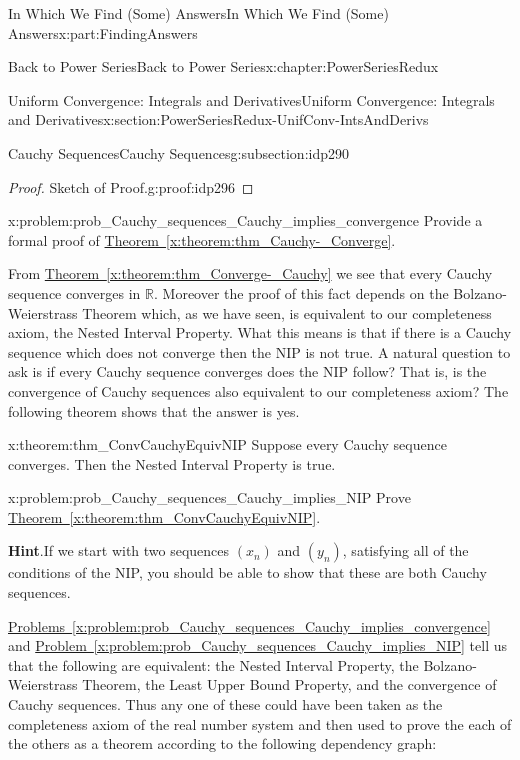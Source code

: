 \documentclass[oneside,10pt,]{book}
\newcommand{\blocktitlefont}{\relax}
\newcommand{\xreffont}{\relax}
\numberwithin{equation}{section}
\newcommand{\RR}{\mathbb {R}}
\begin{document}
\begin{partptx}{In Which We Find (Some) Answers}{}{In Which We Find (Some) Answers}{}{}{x:part:FindingAnswers}
\begin{chapterptx}{Back to Power Series}{}{Back to Power Series}{}{}{x:chapter:PowerSeriesRedux}
\begin{sectionptx}{Uniform Convergence: Integrals and Derivatives}{}{Uniform Convergence: Integrals and Derivatives}{}{}{x:section:PowerSeriesRedux-UnifConv-IntsAndDerivs}
\begin{subsectionptx}{Cauchy Sequences}{}{Cauchy Sequences}{}{}{g:subsection:idp290}
\begin{proof}{Sketch of Proof.}{g:proof:idp296}
\end{proof}
\begin{problem}{}{x:problem:prob_Cauchy_sequences_Cauchy_implies_convergence}%
 Provide a formal proof of \hyperref[x:theorem:thm_Cauchy-_Converge]{Theorem~{\xreffont\ref{x:theorem:thm_Cauchy-_Converge}}}.%
\end{problem}
From \hyperref[x:theorem:thm_Converge-_Cauchy]{Theorem~{\xreffont\ref{x:theorem:thm_Converge-_Cauchy}}} we see that every Cauchy sequence converges in \(\RR\). Moreover the proof of this fact depends on the Bolzano-Weierstrass Theorem which, as we have seen, is equivalent to our completeness axiom, the Nested Interval Property. What this means is that if there is a Cauchy sequence which does not converge then the NIP is not true. A natural question to ask is if every Cauchy sequence converges does the NIP follow? That is, is the convergence of Cauchy sequences also equivalent to our completeness axiom? The following theorem shows that the answer is yes.%
\begin{theorem}{}{}{x:theorem:thm_ConvCauchyEquivNIP}%
 Suppose every Cauchy sequence converges. Then the Nested Interval Property is true.%
\end{theorem}
\begin{problem}{}{x:problem:prob_Cauchy_sequences_Cauchy_implies_NIP}%
Prove \hyperref[x:theorem:thm_ConvCauchyEquivNIP]{Theorem~{\xreffont\ref{x:theorem:thm_ConvCauchyEquivNIP}}}.%
\par\smallskip%
\noindent\textbf{\blocktitlefont Hint}.\hypertarget{g:hint:idp297}{}\quad{}If we start with two sequences \(\left(x_n\right)\) and \(\left(y_n\right)\), satisfying all of the conditions of the NIP, you should be able to show that these are both Cauchy sequences.%
\end{problem}
\hyperref[x:problem:prob_Cauchy_sequences_Cauchy_implies_convergence]{Problems~{\xreffont\ref{x:problem:prob_Cauchy_sequences_Cauchy_implies_convergence}}} and \hyperref[x:problem:prob_Cauchy_sequences_Cauchy_implies_NIP]{Problem~{\xreffont\ref{x:problem:prob_Cauchy_sequences_Cauchy_implies_NIP}}} tell us that the following are equivalent: the Nested Interval Property, the Bolzano-Weierstrass Theorem, the Least Upper Bound Property, and the convergence of Cauchy sequences. Thus any one of these could have been taken as the completeness axiom of the real number system and then used to prove the each of the others as a theorem according to the following dependency graph:%

\end{subsectionptx}
\end{sectionptx}
\end{chapterptx}
\end{partptx}
\end{document}
